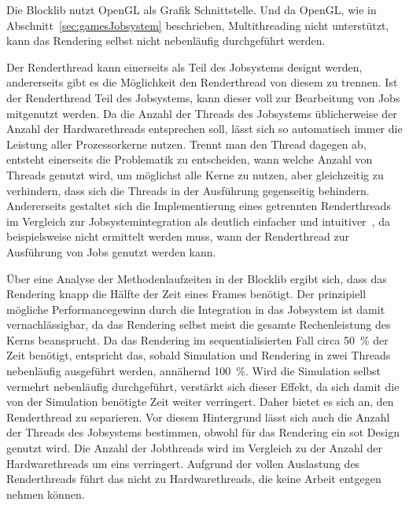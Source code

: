
Die Blocklib nutzt OpenGL als Grafik Schnittstelle. Und da OpenGL, wie in Abschnitt~\ref{sec:gamesJobsystem} beschrieben, Multithreading nicht unterstützt, kann das Rendering selbst nicht nebenläufig durchgeführt werden.

Der Renderthread kann einerseits als Teil des Jobsystems designt werden, andererseits gibt es die Möglichkeit den Renderthread von diesem zu trennen. Ist der Renderthread Teil des Jobsystems, kann dieser voll zur Bearbeitung von Jobs mitgenutzt werden. Da die Anzahl der Threads des Jobsystems üblicherweise der Anzahl der Hardwarethreads entsprechen soll, lässt sich so automatisch immer die Leistung aller Prozessorkerne nutzen. Trennt man den Thread dagegen ab, entsteht einerseits die Problematik zu entscheiden, wann welche Anzahl von Threads genutzt wird, um möglichst alle Kerne zu nutzen, aber gleichzeitig zu verhindern, dass sich die Threads in der Ausführung gegenseitig behindern. Andererseits gestaltet sich die Implementierung eines getrennten Renderthreads im Vergleich zur Jobsystemintegration als deutlich einfacher und intuitiver~\cite{Tatarchuk2014}, da beispielsweise nicht ermittelt werden muss, wann der Renderthread zur Ausführung von Jobs genutzt werden kann.

Über eine Analyse der Methodenlaufzeiten in der Blocklib ergibt sich, dass das Rendering knapp die Hälfte der Zeit eines Frames benötigt. Der prinzipiell mögliche Performancegewinn durch die Integration in das Jobsystem ist damit vernachlässigbar, da das Rendering selbst meist die gesamte Rechenleistung des Kerns beansprucht. Da das Rendering im sequentialisierten Fall circa \SI{50}{\percent} der Zeit benötigt, entspricht das, sobald Simulation und Rendering in zwei Threads nebenläufig ausgeführt werden, annähernd \SI{100}{\percent}. Wird die Simulation selbst vermehrt nebenläufig durchgeführt, verstärkt sich dieser Effekt, da sich damit die von der Simulation benötigte Zeit weiter verringert. Daher bietet es sich an, den Renderthread zu separieren. Vor diesem Hintergrund lässt sich auch die Anzahl der Threads des Jobsystems bestimmen, obwohl für das Rendering ein \ac{sot} Design genutzt wird. Die Anzahl der Jobthreads wird im Vergleich zu der Anzahl der Hardwarethreads um eins verringert. Aufgrund der vollen Auslastung des Renderthreads führt das nicht zu Hardwarethreads, die keine Arbeit entgegen nehmen können.

